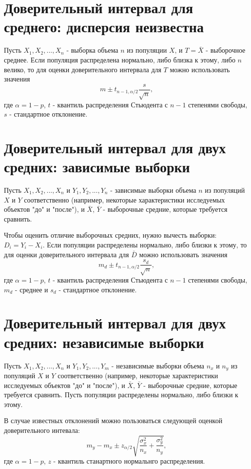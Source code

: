\section{Доверительный интервал для среднего: дисперсия неизвестна}

Пусть $X_1, X_2, ..., X_n$ - выборка объема $n$ из популяции $X$, и $T = \bar{X}$ - выборочное среднее.
Если популяция распределена нормально, либо близка к этому, либо $n$ велико, то для оценки доверительного интервала для $T$ можно использовать значения
$$
m \pm t_{n-1, \alpha/2}\frac{s}{\sqrt{n}},
$$
где $\alpha = 1 - p$, $t$ - квантиль распределения Стьюдента с $n-1$ степенями свободы, $s$ - стандартное отклонение.


\section{Доверительный интервал для двух средних: зависимые выборки}

Пусть $X_1, X_2, ..., X_n$ и $Y_1, Y_2, ..., Y_n$ - зависимые выборки объема $n$ из популяций $X$ и $Y$ соответственно (например, некоторые характеристики исследуемых объектов "до" и "после"), и $\bar{X}$, $\bar{Y}$ - выборочные средние, которые требуется сравнить.

Чтобы оценить отличие выборочных средних, нужно вычесть выборки: $D_i = Y_i - X_i$.
Если популяции распределены нормально, либо близки к этому, то для оценки доверительного интервала для $\bar{D}$ можно использовать значения
$$
m_d \pm t_{n-1, \alpha/2}\frac{s_d}{\sqrt{n}},
$$
где $\alpha = 1 - p$, $t$ - квантиль распределения Стьюдента с $n-1$ степенями свободы, $m_d$ - среднее и $s_d$ - стандартное отклонение.


\section{Доверительный интервал для двух средних: независимые выборки}

Пусть $X_1, X_2, ..., X_n$ и $Y_1, Y_2, ..., Y_m$ - независимые выборки объема $n_x$ и $n_y$ из популяций $X$ и $Y$ соответственно (например, некоторые характеристики исследуемых объектов "до" и "после"), и $\bar{X}$, $\bar{Y}$ - выборочные средние, которые требуется сравнить.
Пусть популяции распределены нормально, либо близки к этому.

В случае известных отклонений можно пользоваться следующей оценкой доверительного интевала:
$$
m_y - m_x \pm z_{\alpha/2}\sqrt{\frac{\sigma_x^2}{n_x} + \frac{\sigma_y^2}{n_y}},
$$
где $\alpha = 1 - p$, $z$ - квантиль станартного нормальнго распределения.


